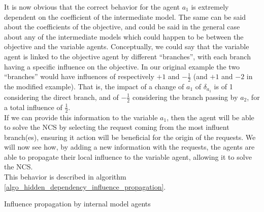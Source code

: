 It is now obvious that the correct behavior for the agent $a_1$ is extremely dependent on the coefficient of the intermediate model. The same can be said about the coefficients of the objective, and could be said in the general case about any of the intermediate models which could happen to be between the objective and the variable agents. Conceptually, we could say that the variable agent is linked to the objective agent by different \enquote{branches}, with each branch having a specific influence on the objective. In our original example the two \enquote{branches} would have influences of respectively $+1$ and $-\frac{1}{2}$ (and $+1$ and $-2$ in the modified example). That is, the impact of a change of $a_1$ of $\delta_{a_1}$ is of 1 considering the direct branch, and of $-\frac{1}{2}$ considering the branch passing by $a_2$, for a total influence of $\frac{1}{2}$.\\
If we can provide this information to the variable $a_1$, then the agent will be able to solve the NCS by selecting the request coming from the most influent branch(es), ensuring it action will be beneficial for the origin of the requests. We will now see how, by adding a new information with the requests, the agents are able to propagate their local influence to the variable agent, allowing it to solve the NCS.\\
This behavior is described in algorithm \ref{algo_hidden_dependency_influence_propagation}.

\begin{algorithm}
\caption{Influence propagation by internal model agents}
\label{algo_hidden_dependency_influence_propagation}

	

\end{algorithm}

